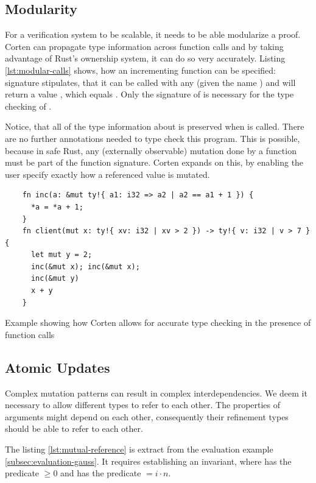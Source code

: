 \documentclass[twoside, english]{sdqthesis}
\theoremstyle{definition}
\begin{document}
\label{sec:modularity}\subsection{Modularity}

For a verification system to be scalable, it needs to be able modularize a proof. Corten can propagate type information across function calls and by taking advantage of Rust's ownership system, it can do so very accurately. Listing \ref{lst:modular-calls} shows, how an incrementing function  can be specified:  signature stipulates, that it can be called with any  (given the name ) and will return a value , which equals . Only the signature of  is necessary for the type checking of . 

Notice, that all of the type information about  is preserved when  is called. There are no further annotations needed to type check this program. This is possible, because in safe Rust, any (externally observable) mutation done by a function must be part of the function signature. Corten expands on this, by enabling the user specify exactly how a referenced value is mutated.

\begin{listing}[ht]
  \begin{verbatim}
    fn inc(a: &mut ty!{ a1: i32 => a2 | a2 == a1 + 1 }) {
      *a = *a + 1;
    }
    fn client(mut x: ty!{ xv: i32 | xv > 2 }) -> ty!{ v: i32 | v > 7 } {
      let mut y = 2;
      inc(&mut x); inc(&mut x);
      inc(&mut y)
      x + y
    }
  \end{verbatim}
  \caption{Example showing how Corten allows for accurate type checking in the presence of function calls }
  \label{lst:modular-calls}
\end{listing}




\label{subsec:atomic-updates}\subsection{Atomic Updates}

Complex mutation patterns can result in complex interdependencies. We deem it necessary to allow different types to refer to each other. 
The properties of arguments might depend on each other, consequently their refinement types should be able to refer to each other.

The listing \ref{lst:mutual-reference} is extract from the evaluation example \ref{subsec:evaluation-gauss}. It requires establishing an invariant, where  has the predicate $\geq 0$ and  has the predicate $= i \cdot n$.
\end{document}
